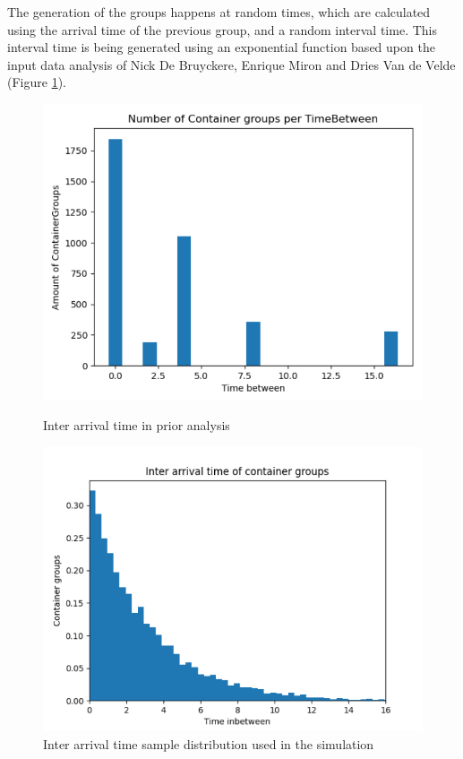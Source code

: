 \documentclass[]{article}
\begin{document}
The generation of the groups happens at random times, which are calculated
using the arrival time of the previous group, and a random interval time. This
interval time is being generated using an exponential function based upon the
input data analysis of Nick De Bruyckere, Enrique Miron and Dries Van de Velde
(Figure \ref{fig: inter arrival time analysis}).
\begin{figure}[!tbp]
	\centering
	\begin{minipage}[b]{0.40\textwidth}
		\includegraphics[width=\textwidth]{Afbeeldingen/inter_arrival_times_hist.png}
		\caption{Inter arrival time in prior analysis}
		\label{fig: inter arrival time analysis}
	\end{minipage}
	\hfill
	\begin{minipage}[b]{0.44\textwidth}
		\includegraphics[width=\textwidth]{Afbeeldingen/inter_arrival_time_sample.png}
		\caption{Inter arrival time sample distribution used in the simulation}
	\end{minipage}
\end{figure}
\end{document}
